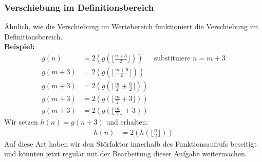 \subsubsection*{Verschiebung im Definitionsbereich}
Ähnlich, wie die Verschiebung im Wertebereich funktioniert die Verschiebung im Definitionsbereich.\\
\textbf{Beispiel:}\\
\begin{align*}
g(n)  &=2\left(g(\lfloor \frac{n+3}{2}\rfloor)\right)&\text{substituiere } n =m+3\\
g(m+3)&=2\left(g(\lfloor \frac{m+6}{2}\rfloor)\right)\\
g(m+3)&=2\left(g(\lfloor \frac{m}{2}+\frac{6}{2}\rfloor)\right)\\
g(m+3)&=2\left(g(\lfloor \frac{m}{2}+3\rfloor)\right)\\
g(m+3)&=2\left(g(\lfloor \frac{m}{2}\rfloor+3)\right)
\end{align*}
Wir setzen $h(n)=g(n+3)$ und erhalten:\\
\begin{align*}
    h(n)&=2\left(h(\lfloor \frac{n}{2}\rfloor)\right)
\end{align*}
Auf diese Art haben wir den Störfaktor innerhalb des Funktionsaufrufs beseitigt und könnten jetzt regular mit der Bearbeitung dieser Aufgabe weitermachen.

